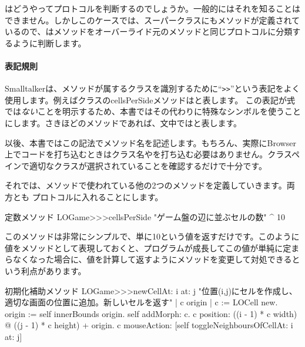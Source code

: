 \documentclass[a4paper,10pt,twoside]{book}
\begin{document}

\pharo はどうやってプロトコルを判断するのでしょうか。一般的に\pharo はそれを知ることはできません。しかしこのケースでは、スーパークラスにもメソッドが定義されているので、\pharo はメソッドをオーバーライド元のメソッドと同じプロトコルに分類するように判断します。



\paragraph{表記規則} Smalltalkerは、メソッドが属するクラスを識別するために``\verb|>>|''という表記をよく使用します。例えばクラスのcellsPerSideメソッドはと表します。
この表記が\st 式では\emph{ない}ことを明示するため、本書ではその代わりに特殊なシンボル\ct{>>>}を使うことにします。さきほどのメソッドであれば、文中ではと表します。


以後、本書ではこの記法でメソッド名を記述します。もちろん、実際にBrowser上でコードを打ち込むときはクラス名や\ct{>>>}を打ち込む必要はありません。クラスペインで適切なクラスが選択されていることを確認するだけで十分です。

それでは、メソッドで使われている他の2つのメソッドを定義していきます。両方とも プロトコルに入れることにします。

\begin{method}[sbegamecellsperside]{定数メソッド}
LOGame>>>cellsPerSide
   "ゲーム盤の辺に並ぶセルの数"
   ^ 10
\end{method}

このメソッドは非常にシンプルで、単に10という値を返すだけです。このように値をメソッドとして表現しておくと、プログラムが成長してこの値が単純に定まらなくなった場合に、値を計算して返すようにメソッドを変更して対処できるという利点があります。

\begin{method}[newCellAt:at:]{初期化補助メソッド}
LOGame>>>newCellAt: i at: j
   "位置(i,j)にセルを作成し、適切な画面の位置に追加。新しいセルを返す"
   | c origin |
   c := LOCell new.
   origin := self innerBounds origin.
   self addMorph: c.
   c position: ((i - 1) * c width) @ ((j - 1) * c height) + origin.
   c mouseAction: [self toggleNeighboursOfCellAt: i at: j]
\end{method}
\end{document}
